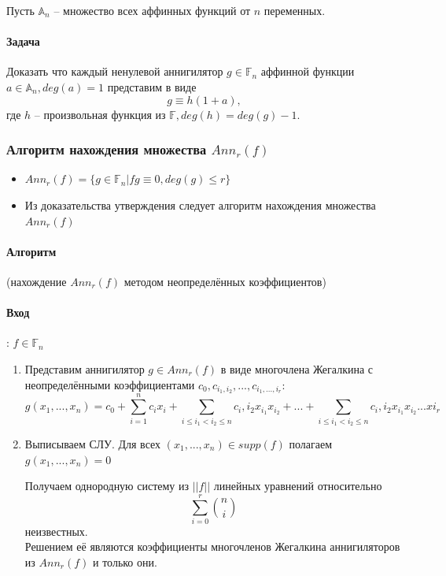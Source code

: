\documentclass[a4paper,12pt]{article}
\begin{document}
Пусть $\mathbb{A}_n$ -- множество всех аффинных функций от $n$
переменных.

\paragraph{Задача} Доказать что каждый ненулевой аннигилятор
$g \in \mathbb{F}_n$ аффинной функции $a \in \mathbb{A}_n,
deg(a) = 1$ представим в виде \[ g \equiv h(1 + a), \] где $h$
-- произвольная функция из $\mathbb{F}, deg(h) = deg(g) - 1$.

\subsubsection{Алгоритм нахождения множества $Ann_r(f)$}
\begin{itemize}
    \item $Ann_r(f) = \{ g \in \mathbb{F}_n | fg \equiv 0,
    deg(g) \leq r \}$
    \item Из доказательства утверждения следует алгоритм
    нахождения множества $Ann_r(f)$
\end{itemize}

\paragraph{Алгоритм} (нахождение $Ann_r(f)$ методом
неопределённых коэффициентов)

\paragraph{Вход}: $f \in \mathbb{F}_n$

\begin{enumerate}
    \item Представим аннигилятор $g \in Ann_r(f)$ в виде
    многочлена Жегалкина с неопределёнными коэффициентами
    $c_0, c_{i_1,i_2}, ..., c_{i_1,..., i_r}$:
    \[ g(x_1, ..., x_n) = c_0 + \sum_{i=1}^n c_ix_i + \sum_{i
        \leq i_1 < i_2 \leq n} c_i, i_2 x_{i_1} x_{i_2} +
        ... + \sum_{i
        \leq i_1 < i_2 \leq n} c_i, i_2 x_{i_1} x_{i_2}
        ... x{i_r} \]
    \item Выписываем СЛУ. Для всех $(x_1, ..., x_n) \in supp(f)$
    полагаем $g(x_1, ..., x_n) = 0$

    Получаем однородную систему из $||f||$ линейных уравнений
    относительно \[ \sum_{i=0}^r \binom{n}{i} \]
    неизвестных.\\
    Решением её являются коэффициенты многочленов Жегалкина
    аннигиляторов из $Ann_r(f)$ и только они.
\end{enumerate}
\end{document}
